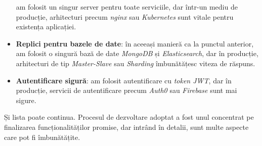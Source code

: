 \begin{itemize}
    am folosit un singur server pentru toate serviciile, dar într-un mediu de producție,
    arhitecturi precum \textit{nginx} sau \textit{Kubernetes} sunt vitale pentru existența aplicației.
    \item \textbf{Replici pentru bazele de date}: în aceeași manieră ca la punctul anterior, am folosit
    o singură bază de date \textit{MongoDB} și \textit{Elasticsearch}, dar în producție, arhitecturi de tip 
    \textit{Master-Slave} sau \textit{Sharding} îmbunătățesc viteza de răspuns.
    \item \textbf{Autentificare sigură}: am folosit autentificare cu \textit{token JWT}, dar în producție,
    servicii de autentificare precum \textit{Auth0} sau \textit{Firebase} sunt mai sigure.
\end{itemize}

\par
Și lista poate continua. Procesul de dezvoltare adoptat a fost unul concentrat pe finalizarea
funcționalităților promise, dar intrând în detalii, sunt multe aspecte care pot fi îmbunătățite.
